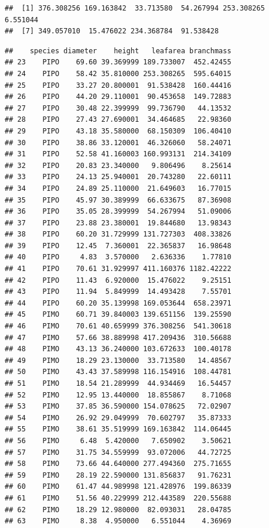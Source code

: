 \documentclass[]{book}
\newenvironment{Shaded}{\begin{snugshade}}{\end{snugshade}}
\newcommand{\CommentTok}[1]{\textcolor[rgb]{0.56,0.35,0.01}{\textit{#1}}}
\newcommand{\KeywordTok}[1]{\textcolor[rgb]{0.13,0.29,0.53}{\textbf{#1}}}
\newcommand{\NormalTok}[1]{#1}
\newcommand{\OperatorTok}[1]{\textcolor[rgb]{0.81,0.36,0.00}{\textbf{#1}}}
\newcommand{\StringTok}[1]{\textcolor[rgb]{0.31,0.60,0.02}{#1}}
\begin{document}
\begin{verbatim}
##  [1] 376.308256 169.163842  33.713580  54.267994 253.308265   6.551044
##  [7] 349.057010  15.476022 234.368784  91.538428
\end{verbatim}

\begin{Shaded}
\end{Shaded}

\begin{verbatim}
##    species diameter    height   leafarea branchmass
## 23    PIPO    69.60 39.369999 189.733007  452.42455
## 24    PIPO    58.42 35.810000 253.308265  595.64015
## 25    PIPO    33.27 20.800001  91.538428  160.44416
## 26    PIPO    44.20 29.110001  90.453658  149.72883
## 27    PIPO    30.48 22.399999  99.736790   44.13532
## 28    PIPO    27.43 27.690001  34.464685   22.98360
## 29    PIPO    43.18 35.580000  68.150309  106.40410
## 30    PIPO    38.86 33.120001  46.326060   58.24071
## 31    PIPO    52.58 41.160003 160.993131  214.34109
## 32    PIPO    20.83 23.340000   9.806496    8.25614
## 33    PIPO    24.13 25.940001  20.743280   22.60111
## 34    PIPO    24.89 25.110000  21.649603   16.77015
## 35    PIPO    45.97 30.389999  66.633675   87.36908
## 36    PIPO    35.05 28.399999  54.267994   51.09006
## 37    PIPO    23.88 23.380001  19.844680   13.98343
## 38    PIPO    60.20 31.729999 131.727303  408.33826
## 39    PIPO    12.45  7.360001  22.365837   16.98648
## 40    PIPO     4.83  3.570000   2.636336    1.77810
## 41    PIPO    70.61 31.929997 411.160376 1182.42222
## 42    PIPO    11.43  6.920000  15.476022    9.25151
## 43    PIPO    11.94  5.849999  14.493428    7.55701
## 44    PIPO    60.20 35.139998 169.053644  658.23971
## 45    PIMO    60.71 39.840003 139.651156  139.25590
## 46    PIMO    70.61 40.659999 376.308256  541.30618
## 47    PIMO    57.66 38.889998 417.209436  310.56688
## 48    PIMO    43.13 36.240000 103.672633  100.40178
## 49    PIMO    18.29 23.130000  33.713580   14.48567
## 50    PIMO    43.43 37.589998 116.154916  108.44781
## 51    PIMO    18.54 21.289999  44.934469   16.54457
## 52    PIMO    12.95 13.440000  18.855867    8.71068
## 53    PIMO    37.85 36.590000 154.078625   72.02907
## 54    PIMO    26.92 29.049999  70.602797   35.87333
## 55    PIMO    38.61 35.519999 169.163842  114.06445
## 56    PIMO     6.48  5.420000   7.650902    3.50621
## 57    PIMO    31.75 34.559999  93.072006   44.72725
## 58    PIMO    73.66 44.640000 277.494360  275.71655
## 59    PIMO    28.19 22.590000 131.856837   91.76231
## 60    PIMO    61.47 44.989998 121.428976  199.86339
## 61    PIMO    51.56 40.229999 212.443589  220.55688
## 62    PIMO    18.29 12.980000  82.093031   28.04785
## 63    PIMO     8.38  4.950000   6.551044    4.36969
\end{verbatim}
\end{document}
